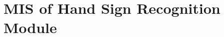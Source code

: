 \documentclass[12pt, titlepage]{article}
\begin{document}

\newpage

\section{MIS of Hand Sign Recognition Module} \label{Module} 
\end{document}
